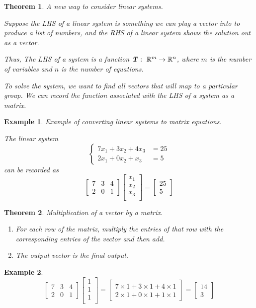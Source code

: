 \documentclass[12pt, a4paper]{article}
\newtheorem{thm}{Theorem}[subsection]
\newtheorem{eg}{Example}[subsection]
\def\R{{\mathbb{R}}}
\begin{document}
\begin{thm}
A new way to consider linear systems.

Suppose the LHS of a linear system is something we can plug a vector into to produce a list of numbers, and the RHS of a linear system shows the solution out as a vector. 

Thus, The LHS of a system is a function $\textbf{\textit{T}}:\ \R^m \rightarrow \R^n$, where $m$ is the number of variables and $n$ is the number of equations. 

To solve the system, we want to find all vectors that will map to a particular group. We can record the function associated with the LHS of a system as a matrix. 
\end{thm}

\begin{eg}
Example of converting linear systems to matrix equations. 

The linear system $$\left\{\begin{aligned}7x_1+3x_2+4x_3&=25\\2x_1+0x_2+x_3&=5\end{aligned}\right.$$ 
can be recorded as
$$\begin{bmatrix}7&3&4\\2&0&1\end{bmatrix}\begin{bmatrix}x_1\\x_2\\x_3\\\end{bmatrix}=\begin{bmatrix}25\\5\end{bmatrix}$$
\end{eg}

\begin{thm}
Multiplication of a vector by a matrix.
\begin{enumerate}
\item For each row of the matrix, multiply the entries of that row with the corresponding entries of the vector and then add.
\item The output vector is the final output. 
\end{enumerate}
\end{thm}

\begin{eg}
 
$$\begin{bmatrix}7&3&4\\2&0&1\end{bmatrix}\begin{bmatrix}1\\1\\1\\\end{bmatrix}=\begin{bmatrix}7\times 1+3\times 1+4\times 1\\2\times 1+0\times 1+1\times 1\end{bmatrix}=\begin{bmatrix}14\\3\end{bmatrix}$$
\end{eg}
\end{document}

